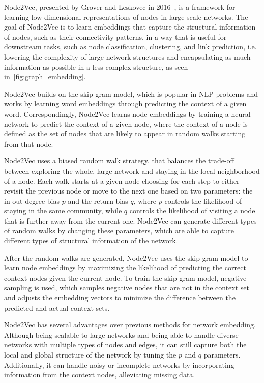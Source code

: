 Node2Vec, presented by Grover and Leskovec in 2016~\cite{2016node2vec}, is a framework for learning low-dimensional representations of nodes in large-scale networks. The goal of Node2Vec is to learn embeddings that capture the structural information of nodes, such as their connectivity patterns, in a way that is useful for downstream tasks, such as node classification, clustering, and link prediction, i.e. lowering the complexity of large network structures and encapsulating as much information as possible in a less complex structure, as seen in~\autoref{fig:graph_embedding}.

Node2Vec builds on the skip-gram model, which is popular in NLP problems and works by learning word embeddings through predicting the context of a given word. Correspondingly, Node2Vec learns node embeddings by training a neural network to predict the context of a given node, where the context of a node is defined as the set of nodes that are likely to appear in random walks starting from that node.

Node2Vec uses a biased random walk strategy, that balances the trade-off between exploring the whole, large network and staying in the local neighborhood of a node. Each walk starts at a given node choosing for each step to either revisit the previous node or move to the next one based on two parameters: the in-out degree bias  $p$ and the return bias $q$, where $p$ controls the likelihood of staying in the same community, while $q$ controls the likelihood of visiting a node that is further away from the current one. Node2Vec can generate different types of random walks by changing these parameters, which are able to capture different types of structural information of the network.

After the random walks are generated, Node2Vec uses the skip-gram model to learn node embeddings by maximizing the likelihood of predicting the correct context nodes given the current node. To train the skip-gram model, negative sampling is used, which samples negative nodes that are not in the context set and adjusts the embedding vectors to minimize the difference between the predicted and actual context sets.

Node2Vec has several advantages over previous methods for network embedding. Although being scalable to large networks and being able to handle diverse networks with multiple types of nodes and edges, it can still capture both the local and global structure of the network by tuning the $p$ and $q$ parameters. Additionally, it can handle noisy or incomplete networks by incorporating information from the context nodes, alleviating missing data.

